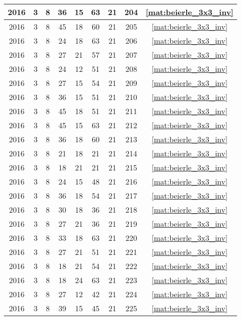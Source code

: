 \begin{longtable}{|c|c|c|c|c|c|c|c|c|}
2016 & 3 & 8 & 36 & 15 & 63 & 21 & 204 & \eqref{mat:beierle_3x3_inv} \\ \hline 
2016 & 3 & 8 & 45 & 18 & 60 & 21 & 205 & \eqref{mat:beierle_3x3_inv} \\ \hline 
2016 & 3 & 8 & 24 & 18 & 63 & 21 & 206 & \eqref{mat:beierle_3x3_inv} \\ \hline 
2016 & 3 & 8 & 27 & 21 & 57 & 21 & 207 & \eqref{mat:beierle_3x3_inv} \\ \hline 
2016 & 3 & 8 & 24 & 12 & 51 & 21 & 208 & \eqref{mat:beierle_3x3_inv} \\ \hline 
2016 & 3 & 8 & 27 & 15 & 54 & 21 & 209 & \eqref{mat:beierle_3x3_inv} \\ \hline 
2016 & 3 & 8 & 36 & 15 & 51 & 21 & 210 & \eqref{mat:beierle_3x3_inv} \\ \hline 
2016 & 3 & 8 & 45 & 18 & 51 & 21 & 211 & \eqref{mat:beierle_3x3_inv} \\ \hline 
2016 & 3 & 8 & 45 & 15 & 63 & 21 & 212 & \eqref{mat:beierle_3x3_inv} \\ \hline 
2016 & 3 & 8 & 36 & 18 & 60 & 21 & 213 & \eqref{mat:beierle_3x3_inv} \\ \hline 
2016 & 3 & 8 & 21 & 18 & 21 & 21 & 214 & \eqref{mat:beierle_3x3_inv} \\ \hline 
2016 & 3 & 8 & 18 & 21 & 21 & 21 & 215 & \eqref{mat:beierle_3x3_inv} \\ \hline 
2016 & 3 & 8 & 24 & 15 & 48 & 21 & 216 & \eqref{mat:beierle_3x3_inv} \\ \hline 
2016 & 3 & 8 & 36 & 18 & 54 & 21 & 217 & \eqref{mat:beierle_3x3_inv} \\ \hline 
2016 & 3 & 8 & 30 & 18 & 36 & 21 & 218 & \eqref{mat:beierle_3x3_inv} \\ \hline 
2016 & 3 & 8 & 27 & 21 & 36 & 21 & 219 & \eqref{mat:beierle_3x3_inv} \\ \hline 
2016 & 3 & 8 & 33 & 18 & 63 & 21 & 220 & \eqref{mat:beierle_3x3_inv} \\ \hline 
2016 & 3 & 8 & 27 & 21 & 51 & 21 & 221 & \eqref{mat:beierle_3x3_inv} \\ \hline 
2016 & 3 & 8 & 18 & 21 & 54 & 21 & 222 & \eqref{mat:beierle_3x3_inv} \\ \hline 
2016 & 3 & 8 & 18 & 24 & 63 & 21 & 223 & \eqref{mat:beierle_3x3_inv} \\ \hline 
2016 & 3 & 8 & 27 & 12 & 42 & 21 & 224 & \eqref{mat:beierle_3x3_inv} \\ \hline 
2016 & 3 & 8 & 39 & 15 & 45 & 21 & 225 & \eqref{mat:beierle_3x3_inv} \\ \hline 

\end{longtable}
